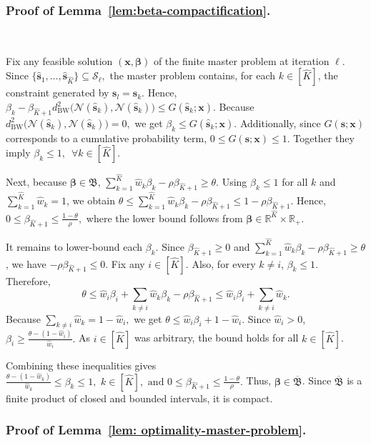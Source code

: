 \documentclass[opre,sglanonrev]{informs4}
\newcommand{\mS}{\mathcal{S}}
\newcommand{\mN}{\mathcal{N}}
\newcommand{\bbeta}{\bm{\beta}}
\newcommand{\bs}{\bm{s}}
\newcommand{\bx}{\bm{x}}
\begin{document}
{\begin{APPENDICES}
\subsubsection{Proof of Lemma~\ref{lem:beta-compactification}. }\,

Fix any feasible solution $(\bx,\bbeta)$ of the finite master problem at
iteration $\ell$. Since $\{\hat{\bs}_1,\ldots,\hat{\bs}_{\hat K}\}\subseteq \mS_\ell,$
the master problem contains, for each $k\in[\hat K]$, the constraint generated
by $\bs_l=\hat{\bs}_k$. Hence, $\beta_k
-
\beta_{\hat K+1}
d^2_{\mathrm{BW}}
\bigl(
\mN(\hat{\bs}_k),\mN(\hat{\bs}_k)
\bigr)
\le
G(\hat{\bs}_k;\bx).$
Because $d^2_{\mathrm{BW}}
\bigl(
\mN(\hat{\bs}_k),\mN(\hat{\bs}_k)
\bigr)=0,$ we get $\beta_k\le G(\hat{\bs}_k;\bx).$
Additionally, since $G(\bs;\bx)$ corresponds to a cumulative probability term, $0\le G(\bs;\bx)\le 1$. Together they imply  $\beta_k\le 1,
\,\,\,
\forall k\in[\hat K].$

Next, because $\bbeta\in\mathfrak B$, $\sum_{k=1}^{\hat K}\hat w_k\beta_k-\rho\beta_{\hat K+1}\ge \theta.$ Using $\beta_k\le 1$ for all $k$ and
$\sum_{k=1}^{\hat K}\hat w_k=1$, we obtain $\theta
\le
\sum_{k=1}^{\hat K}\hat w_k\beta_k-\rho\beta_{\hat K+1}
\le
1-\rho\beta_{\hat K+1}.$
Hence, $0\le \beta_{\hat K+1}\le \frac{1-\theta}{\rho},$ 
where the lower bound follows from
$\bbeta\in\mathbb R^{\hat K}\times\mathbb R_+$.

It remains to lower-bound each $\beta_k$. Since $\beta_{\hat K+1}\ge0$ and $\sum_{k=1}^{\hat K}\hat w_k\beta_k-\rho\beta_{\hat K+1}\ge \theta$, we have $-\rho\beta_{\hat K+1}\le0$. Fix any $i \in[\hat K]$. Also, for every $k\neq i$, $\beta_k\le1$. Therefore,
\[
\theta
\le
\hat w_i\beta_i
+
\sum_{k\neq i}\hat w_k\beta_k
-
\rho\beta_{\hat K+1}
\le
\hat w_i\beta_i
+
\sum_{k\neq i}\hat w_k.
\]
Because $\sum_{k\neq i}\hat w_k=1-\hat w_i,$ 
we get $\theta
\le
\hat w_i\beta_i+1-\hat w_i.$
Since $\hat w_i>0$, $\beta_i
\ge
\frac{\theta-(1-\hat w_i)}{\hat w_i}.$ As $i\in[\hat K]$ was arbitrary, the bound holds for all
$k\in[\hat K]$.

Combining these inequalities gives $\frac{\theta-(1-\hat w_k)}{\hat w_k}
\le \beta_k \le 1, \,\, k\in[\hat K],
\,\, \text{and} \,\, 0\le \beta_{\hat K+1} \le \frac{1-\theta}{\rho}.$ Thus, $\bbeta\in\overline{\mathfrak B}$. Since $\overline{\mathfrak B}$ is a finite product of closed and bounded intervals, it is compact. \hfill\qedsymbol

\subsubsection{Proof of Lemma~\ref{lem: optimality-master-problem}. }




\end{APPENDICES}}
\end{document}
